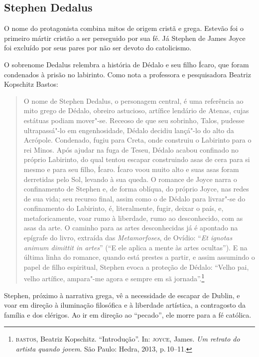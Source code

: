 \subsection{Stephen Dedalus}

O nome do protagonista combina mitos de origem cristã e grega. Estevão
foi o primeiro mártir cristão a ser perseguido por sua fé. Já Stephen de
James Joyce foi excluído por seus pares por não ser devoto do
catolicismo.

O sobrenome Dedalus relembra a história de Dédalo e seu filho Ícaro, que
foram condenados à prisão no labirinto.
Como nota a professora e pesquisadora Beatriz Kopschitz Bastos:

\begin{quote}
O nome de Stephen Dedalus, o personagem central, é uma referência ao
mito grego de Dédalo, obreiro astucioso, artífice lendário de Atenas,
cujas estátuas podiam mover"-se. Receoso de que seu sobrinho, Talos,
pudesse ultrapassá"-lo em engenhosidade, Dédalo decidiu lançá"-lo do alto
da Acrópole. Condenado, fugiu para Creta, onde construiu o Labirinto
para o rei Minos. Após ajudar na fuga de Teseu, Dédalo acabou confinado
no próprio Labirinto, do qual tentou escapar construindo asas de cera
para si mesmo e para seu filho, Ícaro. Ícaro voou muito alto e suas
asas foram derretidas pelo Sol, levando à sua queda. O romance de Joyce
narra o confinamento de Stephen e, de forma oblíqua, do próprio Joyce,
nas redes de sua vida; seu recurso final, assim como o de Dédalo para
livrar"-se do confinamento do Labirinto, é, literalmente, fugir, deixar
o país, e, metaforicamente, voar rumo à liberdade, rumo ao
desconhecido, com as asas da arte. O caminho para as artes
desconhecidas já é apontado na epígrafe do livro, extraída das
\textit{Metamorfoses}, de Ovídio: “\textit{Et ignotas animum dimittit
in artes}” (“E ele aplica a mente às artes ocultas”). E na última linha
do romance, quando está prestes a partir, e assim assumindo o papel de
filho espiritual, Stephen evoca a proteção de Dédalo: “Velho pai, velho
artífice, ampara"-me agora e sempre em sã jornada”.\footnote{\textsc{bastos}, Beatriz Kopschitz. ``Introdução''. In: \textsc{joyce}, James. \textit{Um retrato do artista quando jovem}. São Paulo: Hedra, 2013, p.\,10--11.}
\end{quote}

Stephen, próximo à narrativa grega, vê a necessidade de escapar de Dublin, e voar em direção à iluminação filosófica e à liberdade artística, a contragosto da família e
dos clérigos. Ao ir em direção ao ``pecado'', ele morre para a fé
católica.

